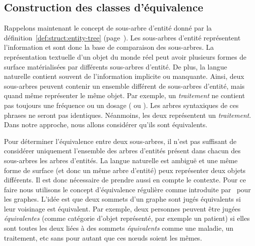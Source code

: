 \subsection{Construction des classes d'équivalence}
\label{sec:struct:equiv-classes}
Rappelons maintenant le concept de sous-arbre d'entité donné par la définition~\ref{def:struct:entity-tree} (page~\pageref{def:struct:entity-tree}).
Les sous-arbres d'entité représentent l'information et sont donc la base de comparaison des sous-arbres.
La représentation textuelle d'un objet du monde réel peut avoir plusieurs formes de surface matérialisées par différents sous-arbres d'entité.
De plus, la langue naturelle contient souvent de l'information implicite ou manquante.
Ainsi, deux sous-arbres peuvent contenir un ensemble différent de sous-arbres d'entité, mais quand même représenter le même objet.
Par exemple, un \emph{traitement} ne contient pas toujours une fréquence ou un dosage ( ou ).
Les arbres syntaxiques de ces phrases ne seront pas identiques.
Néanmoins, les deux représentent un \emph{traitement}.
Dans notre approche, nous allons considérer qu'ils sont équivalents.

Pour déterminer l'équivalence entre deux sous-arbres, il n'est pas suffisant de considérer uniquement l'ensemble des arbres d'entités présent dans chacun des sous-arbres les arbres d'entités.
La langue naturelle est ambiguë et une même forme de surface (et donc un même arbre d'entité) peux représenter deux objets différents.
Il est donc nécessaire de prendre aussi en compte le contexte.
Pour ce faire nous utilisons le concept d'équivalence régulière comme introduite par~\cite{whiteGraphSemigroupHomomorphisms1983} pour les graphes.
L'idée est que deux sommets d'un graphe sont jugés équivalents si leur voisinage est équivalent.
Par exemple, deux personnes peuvent être jugées \emph{équivalentes} (comme catégorie d'objet représenté, par exemple un patient) si elles sont toutes les deux liées à des sommets \emph{équivalents} comme une maladie, un traitement, etc sans pour autant que ces nœuds soient les mêmes.

